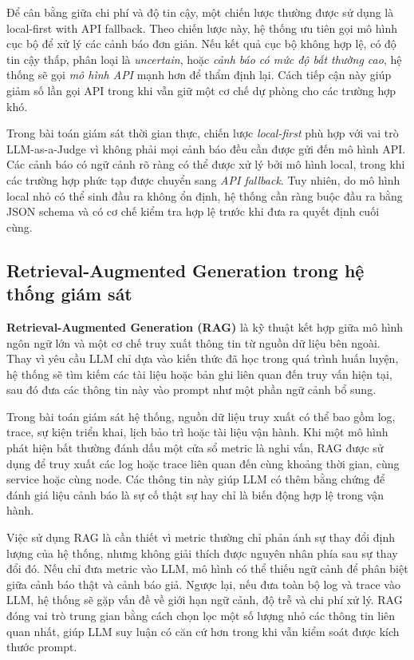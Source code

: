 Để cân bằng giữa chi phí và độ tin cậy, một chiến lược thường được sử dụng là local-first with API fallback. Theo chiến lược này, hệ thống ưu tiên gọi mô hình cục bộ để xử lý các cảnh báo đơn giản. Nếu kết quả cục bộ không hợp lệ, có độ tin cậy thấp, phân loại là\textit{ uncertain}, hoặc \textit{cảnh báo có mức độ bất thường cao}, hệ thống sẽ gọi \textit{mô hình API} mạnh hơn để thẩm định lại. Cách tiếp cận này giúp giảm số lần gọi API trong khi vẫn giữ một cơ chế dự phòng cho các trường hợp khó.

Trong bài toán giám sát thời gian thực, chiến lược \textit{local-first} phù hợp với vai trò LLM-as-a-Judge vì không phải mọi cảnh báo đều cần được gửi đến mô hình API. Các cảnh báo có ngữ cảnh rõ ràng có thể được xử lý bởi mô hình local, trong khi các trường hợp phức tạp được chuyển sang \textit{API fallback}. Tuy nhiên, do mô hình local nhỏ có thể sinh đầu ra không ổn định, hệ thống cần ràng buộc đầu ra bằng JSON schema và có cơ chế kiểm tra hợp lệ trước khi đưa ra quyết định cuối cùng.
\subsection{Retrieval-Augmented Generation trong hệ thống giám sát}

\textbf{Retrieval-Augmented Generation (RAG)} là kỹ thuật kết hợp giữa mô hình ngôn ngữ lớn và một cơ chế truy xuất thông tin từ nguồn dữ liệu bên ngoài. Thay vì yêu cầu LLM chỉ dựa vào kiến thức đã học trong quá trình huấn luyện, hệ thống sẽ tìm kiếm các tài liệu hoặc bản ghi liên quan đến truy vấn hiện tại, sau đó đưa các thông tin này vào prompt như một phần ngữ cảnh bổ sung.

Trong bài toán giám sát hệ thống, nguồn dữ liệu truy xuất có thể bao gồm log, trace, sự kiện triển khai, lịch bảo trì hoặc tài liệu vận hành. Khi một mô hình phát hiện bất thường đánh dấu một cửa sổ metric là nghi vấn, RAG được sử dụng để truy xuất các log hoặc trace liên quan đến cùng khoảng thời gian, cùng service hoặc cùng node. Các thông tin này giúp LLM có thêm bằng chứng để đánh giá liệu cảnh báo là sự cố thật sự hay chỉ là biến động hợp lệ trong vận hành.

Việc sử dụng RAG là cần thiết vì metric thường chỉ phản ánh sự thay đổi định lượng của hệ thống, nhưng không giải thích được nguyên nhân phía sau sự thay đổi đó. Nếu chỉ đưa metric vào LLM, mô hình có thể thiếu ngữ cảnh để phân biệt giữa cảnh báo thật và cảnh báo giả. Ngược lại, nếu đưa toàn bộ log và trace vào LLM, hệ thống sẽ gặp vấn đề về giới hạn ngữ cảnh, độ trễ và chi phí xử lý. RAG đóng vai trò trung gian bằng cách chọn lọc một số lượng nhỏ các thông tin liên quan nhất, giúp LLM suy luận có căn cứ hơn trong khi vẫn kiểm soát được kích thước prompt.

